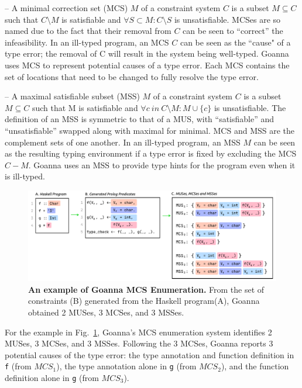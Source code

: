 \documentclass[pdflatex,sn-mathphys-num]{sn-jnl}%
\begin{document}
    – A minimal correction set (MCS) $M$ of a constraint system $C$ is a subset $M \subseteq C$ such that $C \setminus M$ is satisfiable and $\forall{S} \subset M : C \setminus S$ is unsatisfiable. MCSes are so named due to the fact that their removal from $C$ can be seen to “correct” the infeasibility. In an ill-typed program, an MCS $C$ can be seen as the ``cause" of a type error; the removal of C will result in the system being well-typed. Goanna uses MCS to represent potential causes of a type error. Each MCS contains the set of locations that need to be changed to fully resolve the type error.
    
  – A maximal satisfiable subset (MSS) $M$ of a constraint system $C$ is a subset $M \subseteq C$ such that M is satisfiable and $\forall{c}\ in\ C \setminus M:M\cup\{c\}$ is unsatisfiable. The definition of an MSS is symmetric to that of a MUS, with “satisfiable” and “unsatisfiable” swapped along with maximal for minimal. MCS and MSS are the complement sets of one another. In an ill-typed program, an MSS $M$ can be seen as the resulting typing environment if a type error is fixed by excluding the MCS $C - M$. Goanna uses an MSS to provide type hints for the program even when it is ill-typed.
  
 
     \begin{figure}[ht!]
        \centering
        \includegraphics[width=\linewidth]{images/Enumeration-Example}
        \caption{\textbf{An example of Goanna MCS Enumeration.} From the set of constraints (B) generated from the Haskell program(A), Goanna obtained 2 MUSes, 3 MCSes, and 3 MSSes. }
        \label{fig:enumeration-example}
    \end{figure}
    
   For the example in Fig.~\ref{fig:enumeration-example}, Goanna's MCS enumeration system identifies 2 MUSes, 3 MCSes, and 3 MSSes. Following the 3 MCSes, Goanna reports 3 potential causes of the type error: the type annotation and function definition in \texttt{f} (from $MCS_1$), the type annotation alone in \texttt{g} (from $MCS_2$), and the function definition alone in \texttt{g} (from $MCS_3$). 
\end{document}
